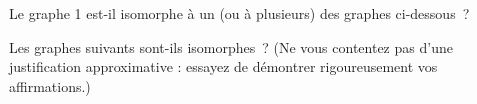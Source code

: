 \begin{exo}
Le graphe 1 est-il isomorphe \`a un (ou \`a plusieurs) des graphes ci-dessous~?
\end{exo}

\begin{center}
\scalebox{.825}{}
\end{center}

\begin{center}
\scalebox{.825}{}
\end{center}

\newpage
\begin{exo}
Les graphes suivants sont-ils isomorphes~? (Ne vous contentez pas d'une justification approximative : essayez de d\'emontrer rigoureusement vos affirmations.)
\end{exo}

\begin{figure}[!h]
\centering

\caption{}
\end{figure}%

\begin{figure}[!h]
\centering

\caption{}
\end{figure}

\begin{figure}[!h]
\centering

\caption{}
\end{figure}
